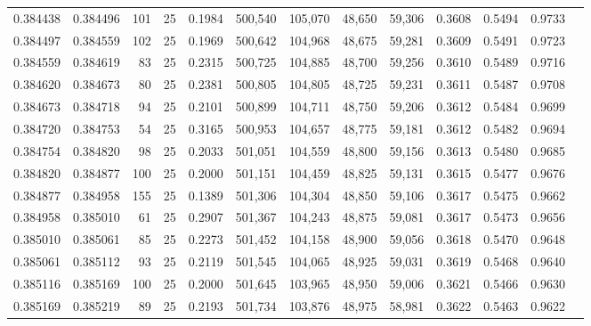\begin{tabular}{rrrrrrrrrrrrr}
0.384438 & 0.384496 &   101 &  25 &                                     0.1984 & 500,540 & 105,070 &  48,650 &  59,306 & 0.3608 & 0.5494 & 0.9733 \\
0.384497 & 0.384559 &   102 &  25 &                                     0.1969 & 500,642 & 104,968 &  48,675 &  59,281 & 0.3609 & 0.5491 & 0.9723 \\
0.384559 & 0.384619 &    83 &  25 &                                     0.2315 & 500,725 & 104,885 &  48,700 &  59,256 & 0.3610 & 0.5489 & 0.9716 \\
0.384620 & 0.384673 &    80 &  25 &                                     0.2381 & 500,805 & 104,805 &  48,725 &  59,231 & 0.3611 & 0.5487 & 0.9708 \\
0.384673 & 0.384718 &    94 &  25 &                                     0.2101 & 500,899 & 104,711 &  48,750 &  59,206 & 0.3612 & 0.5484 & 0.9699 \\
0.384720 & 0.384753 &    54 &  25 &                                     0.3165 & 500,953 & 104,657 &  48,775 &  59,181 & 0.3612 & 0.5482 & 0.9694 \\
0.384754 & 0.384820 &    98 &  25 &                                     0.2033 & 501,051 & 104,559 &  48,800 &  59,156 & 0.3613 & 0.5480 & 0.9685 \\
0.384820 & 0.384877 &   100 &  25 &                                     0.2000 & 501,151 & 104,459 &  48,825 &  59,131 & 0.3615 & 0.5477 & 0.9676 \\
0.384877 & 0.384958 &   155 &  25 &                                     0.1389 & 501,306 & 104,304 &  48,850 &  59,106 & 0.3617 & 0.5475 & 0.9662 \\
0.384958 & 0.385010 &    61 &  25 &                                     0.2907 & 501,367 & 104,243 &  48,875 &  59,081 & 0.3617 & 0.5473 & 0.9656 \\
0.385010 & 0.385061 &    85 &  25 &                                     0.2273 & 501,452 & 104,158 &  48,900 &  59,056 & 0.3618 & 0.5470 & 0.9648 \\
0.385061 & 0.385112 &    93 &  25 &                                     0.2119 & 501,545 & 104,065 &  48,925 &  59,031 & 0.3619 & 0.5468 & 0.9640 \\
0.385116 & 0.385169 &   100 &  25 &                                     0.2000 & 501,645 & 103,965 &  48,950 &  59,006 & 0.3621 & 0.5466 & 0.9630 \\
0.385169 & 0.385219 &    89 &  25 &                                     0.2193 & 501,734 & 103,876 &  48,975 &  58,981 & 0.3622 & 0.5463 & 0.9622 \\

\end{tabular}
